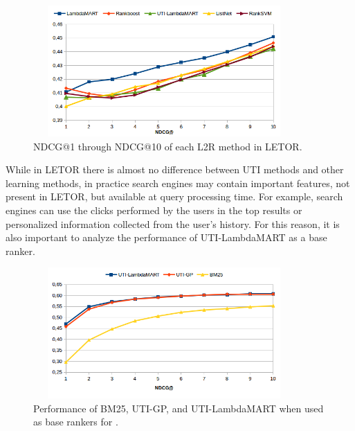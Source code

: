 \documentclass[preprint,review,10pt,3p]{elsarticle}
\begin{document}
\begin{figure}[ht!]

\begin{center}

\includegraphics[width=10cm, height=5cm]{im_ndcg_baseline.png}

\caption{NDCG@1 through NDCG@10 of each L2R method in LETOR.}

\label{fig:ndcg10}

\end{center}

\end{figure}


While in LETOR there is almost no difference between UTI methods and other
learning methods, in practice search engines may contain
important features, not present in LETOR, but available at query processing time. For example, search engines can use the clicks performed by the users in the top results or personalized information collected from the user's history. For this reason, it is also important to analyze the performance of UTI-LambdaMART as a base ranker.

\begin{figure}[ht!]
\centering
\includegraphics[width=10cm, height=5cm]{im_ndcg10leprefbm25.png}
\caption{Performance of BM25, UTI-GP, and UTI-LambdaMART when used as base rankers for \lambdamart.}
\label{fig:bm25}
\end{figure}
\end{document}
